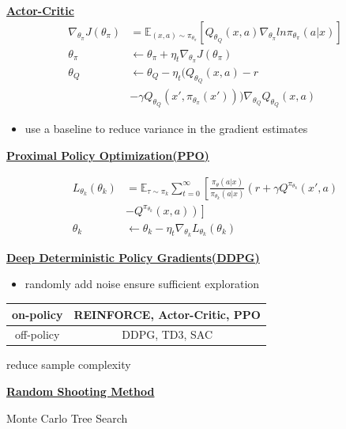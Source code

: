 \documentclass[landscape,a0paper,fontscale=0.285]{baposter} %
\newcommand{\compresslist}{ %
\setlength{\itemsep}{1pt}
\setlength{\parskip}{0pt}
\setlength{\parsep}{0pt}
}
\begin{document}
\begin{poster}
{\underline{\textbf{Actor-Critic}}
\vspace{-0.3cm}
$$
\begin{aligned}
\nabla_{\theta_\pi} J(\theta_\pi) &= \mathbb E_{(x,a)\sim \pi_{\theta_\pi}} 
[Q_{\theta_Q}(x,a)\nabla_{\theta_\pi}ln\pi_{\theta_\pi}(a|x)]
\\
\theta_\pi &\leftarrow \theta_\pi + \eta_t \nabla_{\theta_\pi}J(\theta_\pi)
\\
\theta_Q &\leftarrow \theta_Q - \eta_t(Q_{\theta_Q}(x,a) - r \\
&- \gamma Q_{\theta_Q}(x',\pi_{\theta_\pi}(x')))\nabla_{\theta_Q}Q_{\theta_Q}(x,a)
\end{aligned}
$$
\begin{itemize}\compresslist
    \item use a baseline to reduce variance in the gradient estimates
\end{itemize}

\underline{\textbf{Proximal Policy Optimization(PPO)}}

$$
\begin{aligned}
L_{\theta_k}(\theta_k) &= \mathbb E_{\tau \sim \pi_k}\sum_{t=0}^\infty \left[\frac{\pi_\theta(a|x)}{\pi_{\theta_k}(a|x)}\left(r + \gamma Q^{\pi_{\theta_k}}(x',a)\right.\right.\\
&\left.\left.-Q^{\pi_{\theta_k}}(x,a)\right)\right]
\\
\theta_k &\leftarrow \theta_k - \eta_t \nabla_{\theta_k}L_{
\theta_k}(\theta_k)
\end{aligned}
$$

\underline{\textbf{Deep Deterministic Policy Gradients(DDPG)}}
\begin{itemize}\compresslist
    \item randomly add noise ensure sufficient  exploration
\end{itemize}


\begin{tabular}{|c|c|}
    \hline
     on-policy &  REINFORCE, Actor-Critic, PPO \\
     \hline
     off-policy&  DDPG, TD3, SAC\\
     \hline
\end{tabular}

\colorbox[HTML]{CCFFFF}{}

reduce sample complexity

\underline{\textbf{Random Shooting Method}}

Monte Carlo Tree Search

}
\end{poster}
\end{document}
